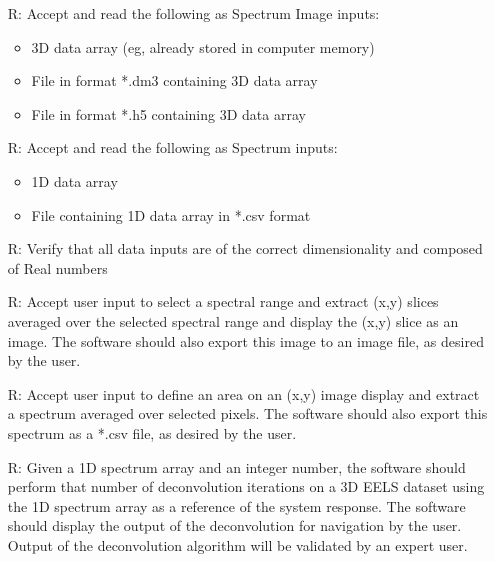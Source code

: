 \documentclass[12pt]{article}
\newcounter{reqnum} %
\begin{document}
\noindent \begin{itemize}

	\item[R\refstepcounter{reqnum}\thereqnum \label{R_SI_inputs}:] Accept and read the following as Spectrum Image inputs:
	
	\begin{itemize}
		\item 3D data array (eg, already stored in computer memory)
		\item File in format *.dm3 containing 3D data array
		\item File in format *.h5 containing 3D data array
	\end{itemize}
	
	\item[R\refstepcounter{reqnum}\thereqnum \label{R_spectrum_inputs}:] Accept and read the following as Spectrum inputs:
	
	\begin{itemize}
		\item 1D data array
		\item File containing 1D data array in *.csv format
	\end{itemize}

	\item[R\refstepcounter{reqnum}\thereqnum \label{R_Input_dimension}:] Verify that all data inputs are of the correct dimensionality and composed of Real numbers
	
	\item[R\refstepcounter{reqnum}\thereqnum \label{R_SI_slicing}:] Accept user input to select a spectral range and extract (x,y) slices averaged over the selected spectral range and display the (x,y) slice as an image. The software should also export this image to an image file, as desired by the user.
	
	\item[R\refstepcounter{reqnum}\thereqnum \label{R_SI_area}:] Accept user input to define an area on an (x,y) image display and extract a spectrum averaged over selected pixels. The software should also export this spectrum as a *.csv file, as desired by the user.
	
	\item[R\refstepcounter{reqnum}\thereqnum \label{R_deconvolution}:] Given a 1D spectrum array and an integer number, the software should perform that number of deconvolution iterations on a 3D EELS dataset using the 1D spectrum array as a reference of the system response. The software should display the output of the deconvolution for navigation by the user. Output of the deconvolution algorithm will be validated by an expert user. 
	

\end{itemize}
\end{document}
